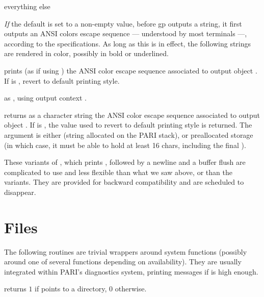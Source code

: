 \item {} everything else

\emph{If} the  default is set to a non-empty value, before gp
outputs a string, it first outputs an ANSI colors escape sequence ---
understood by most terminals ---, according to the 
specifications. As long as this is in effect, the following strings are
rendered in color, possibly in bold or underlined.

 prints (as if using ) the ANSI
color escape sequence associated to output object . If  is
, revert to default printing style.

 as ,
using output context .

 returns as a character
string the ANSI color escape sequence associated to output object .
If  is , the value used to revert to default printing
style is returned. The argument  is either  (string
allocated on the PARI stack), or preallocated storage (in which case, it must
be able to hold at least 16 chars, including the final ).


These variants of , which prints , followed by
a newline and a buffer flush are complicated to use and less flexible
than what we saw above, or than the  variants. They are
provided for backward compatibility and are scheduled to disappear.




\section{Files}

The following routines are trivial wrappers around system functions
(possibly around one of several functions depending on availability).
They are usually integrated within PARI's diagnostics system, printing
messages if  is high enough.

 returns $1$ if  points to
a directory, $0$ otherwise.

